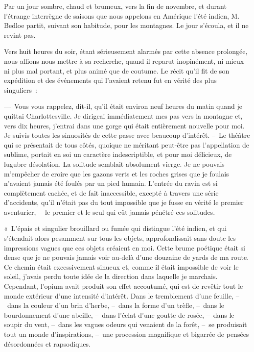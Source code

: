 \documentclass[french,twoside]{book} %
\begin{document}
Par un jour sombre, chaud et brumeux, vers la fin de novembre, et durant l’étrange interrègne de saisons que nous appelons en Amérique l’été indien, M. Bedloe partit, suivant son habitude, pour les montagnes. Le jour s’écoula, et il ne revint pas.\par
Vers huit heures du soir, étant sérieusement alarmés par cette absence prolongée, nous allions nous mettre à sa recherche, quand il reparut inopinément, ni mieux ni plus mal portant, et plus animé que de coutume. Le récit qu’il fit de son expédition et des événements qui l’avaient retenu fut en vérité des plus singuliers :\par
\bigbreak
\noindent — Vous vous rappelez, dit-il, qu’il était environ neuf heures du matin quand je quittai Charlottesville. Je dirigeai immédiatement mes pas vers la montagne et, vers dix heures, j’entrai dans une gorge qui était entièrement nouvelle pour moi. Je suivis toutes les sinuosités de cette passe avec beaucoup d’intérêt. – Le théâtre qui se présentait de tous côtés, quoique ne méritant peut-être pas l’appellation de sublime, portait en soi un caractère indescriptible, et pour moi délicieux, de lugubre désolation. La solitude semblait absolument vierge. Je ne pouvais m’empêcher de croire que les gazons verts et les roches grises que je foulais n’avaient jamais été foulés par un pied humain. L’entrée du ravin est si complètement cachée, et de fait inaccessible, excepté à travers une série d’accidents, qu’il n’était pas du tout impossible que je fusse en vérité le premier aventurier, – le premier et le seul qui eût jamais pénétré ces solitudes.\par
« L’épais et singulier brouillard ou fumée qui distingue l’été indien, et qui s’étendait alors pesamment sur tous les objets, approfondissait sans doute les impressions vagues que ces objets créaient en moi. Cette brume poétique était si dense que je ne pouvais jamais voir au-delà d’une douzaine de yards de ma route. Ce chemin était excessivement sinueux et, comme il était impossible de voir le soleil, j’avais perdu toute idée de la direction dans laquelle je marchais. Cependant, l’opium avait produit son effet accoutumé, qui est de revêtir tout le monde extérieur d’une intensité d’intérêt. Dans le tremblement d’une feuille, – dans la couleur d’un brin d’herbe, – dans la forme d’un trèfle, – dans le bourdonnement d’une abeille, – dans l’éclat d’une goutte de rosée, – dans le soupir du vent, – dans les vagues odeurs qui venaient de la forêt, – se produisait tout un monde d’inspirations, – une procession magnifique et bigarrée de pensées désordonnées et rapsodiques.\par
\end{document}
